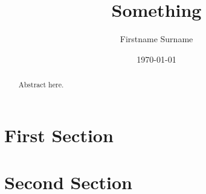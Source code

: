 \documentclass[12pt]{article}
\newcommand{\MyName}{Firstname Surname}
\newcommand{\MyTitle}{Something}
\begin{document}
    \title{\MyTitle}
    \author{\MyName}
    \date{\today}
    \maketitle

    \begin{abstract}
        Abstract here.
    \end{abstract}

    \newpage

    \tableofcontents

    \newpage


    \section{First Section}

    \section{Second Section}
\end{document}
